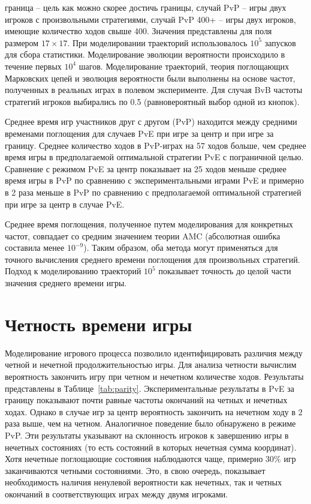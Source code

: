 \begin{table}[]
{        граница -- цель как можно скорее достичь границы, случай PvP -- игры двух игроков с произвольными стратегиями,
        случай PvP 400+ -- игры двух игроков, имеющие количество ходов свыше 400.
        Значения представлены для поля размером $17 \times 17$. При моделировании траекторий использовалось $10^5$ запусков для сбора статистики.
        Моделирование эволюции вероятности происходило в течение первых $10^4$ шагов. 
        Моделирование траекторий, теория поглощающих Марковских цепей и эволюция вероятности были выполнены на основе частот,
        полученных в реальных играх в полевом эксперименте. Для случая BvB частоты стратегий игроков выбирались по 0.5 (равновероятный выбор одной из кнопок).
    }
    \label{tab:time}
\end{table}

Среднее время игр участников друг с другом (PvP) находится между средними временами поглощения для случаев PvE при игре за центр и при игре за границу. 
Среднее количество ходов в PvP-играх на 57 ходов больше, 
чем среднее время игры в предполагаемой оптимальной стратегии PvE с пограничной целью. 
Сравнение с режимом PvE за центр показывает на 25 ходов меньше среднее время игры в PvP по сравнению 
с экспериментальными играми PvE и примерно в 2 раза меньше в PvP по сравнению с предполагаемой оптимальной стратегией при игре за центр в случае PvE.

Среднее время поглощения, полученное путем моделирования для конкретных частот, 
совпадает со средним значением теории AMC (абсолютная ошибка составила менее $10^{-9}$). 
Таким образом, оба метода могут применяться для точного вычисления среднего времени поглощения для произвольных стратегий. 
Подход к моделированию траекторий $10^5$ показывает точность до целой части значения среднего времени игры.

\section{Четность времени игры}\label{sec:ch3/sec2}

Моделирование игрового процесса позволило идентифицировать различия между четной и нечетной продолжительностью игры. 
Для анализа четности вычислим вероятность закончить игру при четном и нечетном количестве ходов.
Результаты представлены в Таблице~\cref{tab:parity}. Экспериментальные результаты в PvE за границу показывают почти равные частоты окончаний на четных и нечетных ходах. 
Однако в случае игр за центр вероятность закончить на нечетном ходу в $2$ раза выше, чем на четном. Аналогичное поведение было обнаружено в режиме PvP. 
Эти результаты указывают на склонность игроков к завершению игры в нечетных состояниях (то есть состояний в которых нечетная сумма координат). 
Хотя нечетные поглощающие состояния наблюдаются чаще, примерно $30\%$ игр заканчиваются четными состояниями. 
Это, в свою очередь, показывает необходимость наличия ненулевой вероятности как нечетных, так и четных окончаний в соответствующих играх между двумя игроками.

